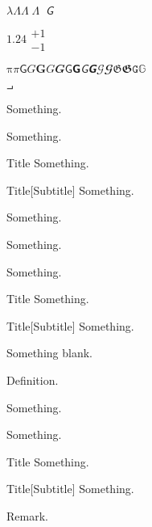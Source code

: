 \documentclass[a4paper]{article}
\begin{document}
$\lambda  \Lambda \varLambda \mitLambda \mitsansG$

$1.24 \substack{+1 \\ -1}$

$\mathup{π}π\mathsf{G}G 	𝐆 	𝐺 	𝑮 	𝖦 	𝗚 	𝘎 	𝙂 	𝒢 	𝓖 	𝔊 	𝕲 	𝙶 	𝔾$

$\intprod$

\begin{thm}
Something.
\end{thm}

\begin{thm}[Subtitle]
Something.
\end{thm}

\begin{namedthm}{Title}
Something.
\end{namedthm}

\begin{namedthm}{Title}[Subtitle]
Something.
\end{namedthm}

\begin{unamedthm}
Something.
\end{unamedthm}

\begin{defn}
Something.
\end{defn}

\begin{defn}[Subtitle]
Something.
\end{defn}

\begin{nameddef}{Title}
Something.
\end{nameddef}

\begin{nameddef}{Title}[Subtitle]
Something.
\end{nameddef}

\begin{nameddef}{ }
Something blank.
\end{nameddef}

\begin{unameddef}
Definition.
\end{unameddef}

\begin{rem}
Something.
\end{rem}

\begin{rem}[Subtitle]
Something.
\end{rem}

\begin{namedrem}{Title}
Something.
\end{namedrem}

\begin{namedrem}{Title}[Subtitle]
Something.
\end{namedrem}

\begin{unamedrem}
Remark.
\end{unamedrem}
\end{document}
